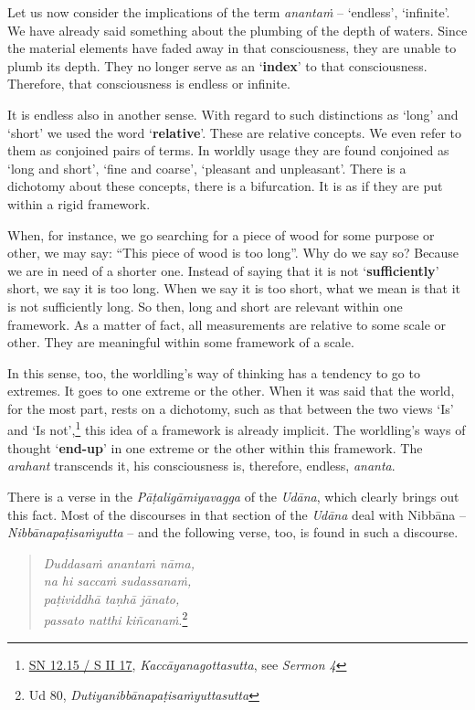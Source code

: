 Let us now consider the implications of the term \emph{anantaṁ} -- `endless', `infinite'. We have already said something about the plumbing of the depth of waters. Since the material elements have faded away in that consciousness, they are unable to plumb its depth. They no longer serve as an `\textbf{index}' to that consciousness. Therefore, that consciousness is endless or infinite.

It is endless also in another sense. With regard to such distinctions as `long' and `short' we used the word `\textbf{relative}'. These are relative concepts. We even refer to them as conjoined pairs of terms. In worldly usage they are found conjoined as `long and short', `fine and coarse', `pleasant and unpleasant'. There is a dichotomy about these concepts, there is a bifurcation. It is as if they are put within a rigid framework.

When, for instance, we go searching for a piece of wood for some purpose or other, we may say: ``This piece of wood is too long''. Why do we say so? Because we are in need of a shorter one. Instead of saying that it is not `\textbf{sufficiently}' short, we say it is too long. When we say it is too short, what we mean is that it is not sufficiently long. So then, long and short are relevant within one framework. As a matter of fact, all measurements are relative to some scale or other. They are meaningful within some framework of a scale.

In this sense, too, the worldling's way of thinking has a tendency to go to extremes. It goes to one extreme or the other. When it was said that the world, for the most part, rests on a dichotomy, such as that between the two views `Is' and `Is not',\footnote{\href{https://suttacentral.net/sn12.15/pli/ms}{SN 12.15 / S II 17}, \emph{Kaccāyanagottasutta}, see \emph{Sermon 4}} this idea of a framework is already implicit. The worldling's ways of thought `\textbf{end-up}' in one extreme or the other within this framework. The \emph{arahant} transcends it, his consciousness is, therefore, endless, \emph{ananta}.

There is a verse in the \emph{Pāṭaligāmiyavagga} of the \emph{Udāna}, which clearly brings out this fact. Most of the discourses in that section of the \emph{Udāna} deal with Nibbāna -- \emph{Nibbānapaṭisaṁyutta} -- and the following verse, too, is found in such a discourse.

\begin{quote}
\emph{Duddasaṁ anantaṁ nāma,}\\
\emph{na hi saccaṁ sudassanaṁ,}\\
\emph{paṭividdhā taṇhā jānato,}\\
\emph{passato natthi kiñcanaṁ}.\footnote{Ud 80, \emph{Dutiyanibbānapaṭisaṁyuttasutta}}
\end{quote}

